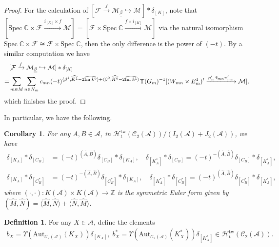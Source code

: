 \documentclass[12pt]{amsart}
\newtheorem{corollary}[theorem]{Corollary}
\theoremstyle{definition}
\newtheorem{definition}[theorem]{Definition}
\numberwithin{equation}{section}
\begin{document}
\begin{proof}
For the calculation of $ [\mathcal{F} \xrightarrow{f} \mathcal{M}_{\underline{\beta}} \hookrightarrow \mathcal{M} ] * \delta_{[K]}  $, note that $  [\mathrm{Spec}\;\mathbb{C} \times \mathcal{F} \xrightarrow{i_{[K]} \times f } \mathcal{M}] = [\mathcal{F} \times \mathrm{Spec}\;\mathbb{C} \xrightarrow{f \times i_{[K] }} \mathcal{M}  ] $ via the natural isomorphism $ \mathrm{Spec}\;\mathbb{C} \times \mathcal{F} \cong \mathcal{F} \times \mathrm{Spec}\;\mathbb{C} $, then the only difference is the power of $ (-t) $. 
By a similar computation we have
\begin{align*}
    &[\mathcal{F} \xrightarrow{f} \mathcal{M}_{\underline{\beta}} \hookrightarrow \mathcal{M} ] * \delta_{[K]} \\
    =& \sum_{m \in M}\sum_{n \in N_m}c_{mn}(-t)^{\langle \beta^1,\widehat{K^1} - 2 \widehat{\mathrm{Im}\;k^0} \rangle + \langle \beta^0, \widehat{K^0} - 2 \widehat{\mathrm{Im}\;k^1}\rangle}\Upsilon(G_m)^{-1} [(W_{mn} \times E_m^1)' \xrightarrow{\varphi_m' \Tilde{\tau}_{mn} \pi_{mn}'} \mathcal{M}] ,
\end{align*}
which finishes the proof.

\end{proof}

In particular, we have the following.

\begin{corollary}
    \label{KACB}
    For any $ A,B \in \mathcal{A} $, in $ \mathcal{H}_t^{\mathrm{tw}}(\mathcal{C}_2(\mathcal{A}))/(I_2(\mathcal{A})+J_2(\mathcal{A})) $, we have
    \begin{align*}
        \delta_{[K_A]} * \delta_{[C_B]} &= (-t)^{(\widehat{A},\widehat{B})}  \delta_{[C_B]} * \delta_{[K_A]},\quad \delta_{[K_A^*]} * \delta_{[C_B]} = (-t)^{-(\widehat{A},\widehat{B})}  \delta_{[C_B]} * \delta_{[K_A^*]},\\
        \delta_{[K_A]} * \delta_{[C_B^*]} &= (-t)^{-(\widehat{A},\widehat{B})} \delta_{[C_B^*]} * \delta_{[K_A]},\quad \delta_{[K_A^*]} * \delta_{[C_B^*]} = (-t)^{(\widehat{A},\widehat{B})}  \delta_{[C_B^*]} * \delta_{[K_A^*]},
    \end{align*}
    where $ (\cdot, \cdot):K(\mathcal{A}) \times K(\mathcal{A}) \to \mathbb{Z} $ is the symmetric Euler form given by $ (\widehat{M},\widehat{N}) = \langle \widehat{M}, \widehat{N} \rangle + \langle \widehat{N}, \widehat{M} \rangle $.

\end{corollary}

\begin{definition}
    For any $ X \in \mathcal{A} $, define the elements
\begin{align*}
    b_X = \Upsilon(\mathrm{Aut}_{\mathcal{C}_2(\mathcal{A})}(K_X)) \delta_{[K_X]},\;
    b_X^* = \Upsilon(\mathrm{Aut}_{\mathcal{C}_2(\mathcal{A})}(K_X^*)) \delta_{[K_X^*]} \in \mathcal{H}_t^{\mathrm{tw}}(\mathcal{C}_2(\mathcal{A})).
\end{align*}
\end{definition}
\end{document}
